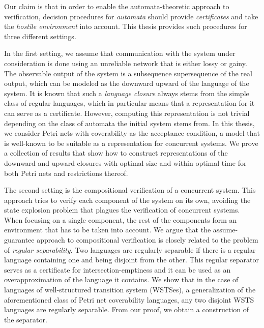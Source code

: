 \documentclass[../../diss.tex]{subfiles}
\begin{document}
Our claim is that in order to enable the automata-theoretic approach to verification, decision procedures for \emph{automata} should provide \emph{certificates} and take the \emph{hostile environment} into account.
This thesis provides such procedures for three different settings.

In the first setting, we assume that communication with the system under consideration is done using an unreliable network that is either lossy or gainy.
The observable output of the system is a subsequence \resp supersequence of the real output, which can be modeled as the downward \resp upward  of the language of the system.
It is known that such a \emph{language closure} always stems from the simple class of regular languages, which in particular means that a representation for it can serve as a certificate.
However, computing this representation is not trivial depending on the class of automata the initial system stems from.
In this thesis, we consider Petri nets with coverability as the acceptance condition, a model that is well-known to be suitable as a representation for concurrent systems.
We prove a collection of results that show how to construct representations of the downward and upward closures with optimal size and within optimal time for both Petri nets and restrictions thereof.

The second setting is the compositional verification of a concurrent system.
This approach tries to verify each component of the system on its own, avoiding the state explosion problem that plagues the verification of concurrent systems.
When focusing on a single component, the rest of the components form an environment that has to be taken into account.
We argue that the assume-guarantee approach to compositional verification is closely related to the problem of \emph{regular separability}.
Two languages are regularly separable if there is a regular language containing one and being disjoint from the other.
This regular separator serves as a certificate for intersection-emptiness and it can be used as an overapproximation of the language it contains.
We show that in the case of languages of well-structured transition system (WSTSes), a generalization of the aforementioned class of Petri net coverability languages, any two disjoint WSTS languages are regularly separable.
From our proof, we obtain a construction of the separator.
\end{document}
